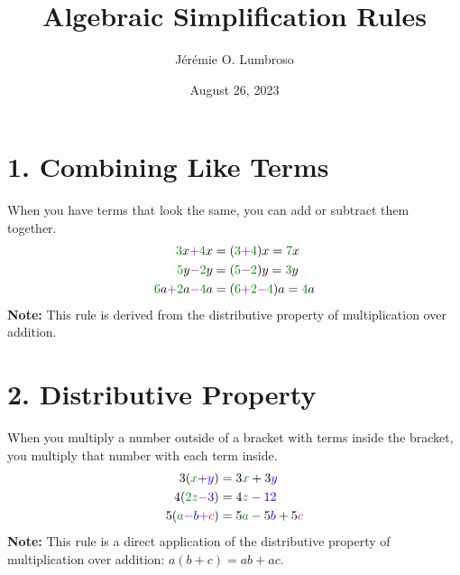 \documentclass[12pt]{article}
\title{Algebraic Simplification Rules}
\author{Jérémie O. Lumbroso}
\date{August 26, 2023}
\begin{document}
\maketitle

\section*{1. Combining Like Terms}
When you have terms that look the same, you can add or subtract them together.
\begin{align*}
    {\color{factorA}3}x {\color{operator}+} {\color{factorA}4}x & = ({\color{factorA}3 {\color{operator}+} 4})x = {\color{factorA}7}x \\
    {\color{factorA}5}y {\color{operator}-} {\color{factorA}2}y & = ({\color{factorA}5 {\color{operator}-} 2})y = {\color{factorA}3}y \\
    {\color{factorA}6}a {\color{operator}+} {\color{factorA}2}a {\color{operator}-} {\color{factorA}4}a & = ({\color{factorA}6 {\color{operator}+} 2 {\color{operator}-} 4})a = {\color{factorA}4}a
\end{align*}
\textbf{Note:} This rule is derived from the distributive property of multiplication over addition.

\section*{2. Distributive Property}
When you multiply a number outside of a bracket with terms inside the bracket, you multiply that number with each term inside.
\begin{align*}
    3({\color{factorA}x} {\color{operator}+} {\color{factorB}y}) & = 3{\color{factorA}x} + 3{\color{factorB}y} \\
    4({\color{factorA}2z} {\color{operator}-} {\color{factorB}3}) & = 4{\color{factorA}z} - {\color{factorB}12} \\
    5({\color{factorA}a} {\color{operator}-} {\color{factorB}b} {\color{operator}+} {\color{alternate}c}) & = 5{\color{factorA}a} - 5{\color{factorB}b} + 5{\color{alternate}c}
\end{align*}
\textbf{Note:} This rule is a direct application of the distributive property of multiplication over addition: \(a(b + c) = ab + ac\).
\end{document}
